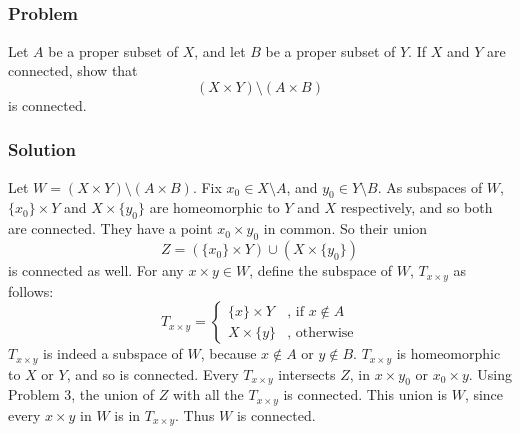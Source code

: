 
\setcounter{subsection}{8} %
\subsection{}

\subsubsection{Problem}
Let $A$ be a proper subset of $X$, and let $B$ be a proper subset of $Y$. If $X$ and $Y$ are connected, show that
\[(X \times Y) \setminus (A \times B)\]
is connected.

\subsubsection{Solution}
Let $W = (X \times Y) \setminus (A \times B)$. Fix $x_0 \in X \setminus A$, and $y_0 \in Y \setminus B$. As subspaces of $W$, $\{x_0\} \times Y$ and $X \times \{y_0\}$ are homeomorphic to $Y$ and $X$ respectively, and so both are connected.  They have a point $x_0 \times y_0$ in common. So their union
\[Z = (\{x_0\} \times Y) \cup (X \times \{y_0\})\]
is connected as well. For any $x \times y \in W$, define the subspace of $W$, $T_{x \times y}$ as follows:
\[T_{x \times y} =
\begin{cases}
\{x\} \times Y &\textrm{, if } x \notin A \\
X \times \{y\} &\textrm{, otherwise}
\end{cases}
\]
$T_{x \times y}$ is indeed a subspace of $W$, because $x \notin A$ or $y \notin B$. $T_{x \times y}$ is homeomorphic to $X$ or $Y$, and so is connected.  Every $T_{x \times y}$ intersects $Z$, in $x \times y_0$ or $x_0 \times y$. Using Problem 3, the union of $Z$ with all the $T_{x\times y}$ is connected. This union is $W$, since every $x \times y$ in $W$ is in $T_{x \times y}$. Thus $W$ is connected.
